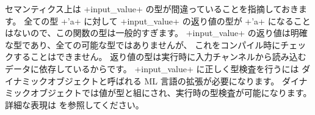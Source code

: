 セマンティクス上は \ml+input_value+ の型が間違っていることを指摘しておきます。
全ての型 \ml+'a+ に対して \ml+input_value+ の返り値の型が
\ml+'a+ になることはないので、この関数の型は一般的すぎます。
\ml+input_value+ の返り値は明確な型であり、全ての可能な型ではありませんが、
これをコンパイル時にチェックすることはできません。
返り値の型は実行時に入力チャンネルから読み込むデータに依存しているからです。
\ml+input_value+ に正しく型検査を行うには
ダイナミックオブジェクトと呼ばれる ML 言語の拡張が必要になります。
ダイナミックオブジェクトでは値が型と組にされ、実行時の型検査が可能になります。
詳細な表現は \cite{Dynamiques} を参照してください。


